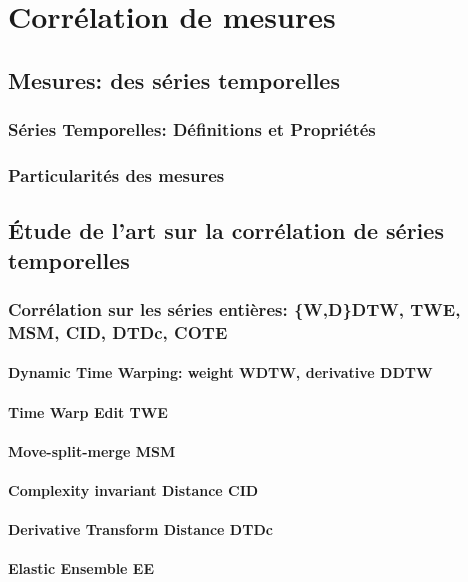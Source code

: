 \chapter{Corr\'elation de mesures}
	\section{Mesures: des s\'eries temporelles}
		\subsection{S\'eries Temporelles: D\'efinitions et Propri\'et\'es}
		\subsection{Particularit\'es des mesures}

	\section{\'Etude de l'art sur la corr\'elation de s\'eries temporelles}
		\subsection{Corr\'elation sur les s\'eries enti\`eres: \{W,D\}DTW, TWE, MSM, CID, DTDc, COTE}
			\subsubsection{Dynamic Time Warping: weight WDTW, derivative DDTW }
			\subsubsection{Time Warp Edit TWE}
			\subsubsection{Move-split-merge MSM}
			\subsubsection{Complexity invariant Distance CID}
			\subsubsection{Derivative Transform Distance DTDc}
			\subsubsection{Elastic Ensemble EE}
